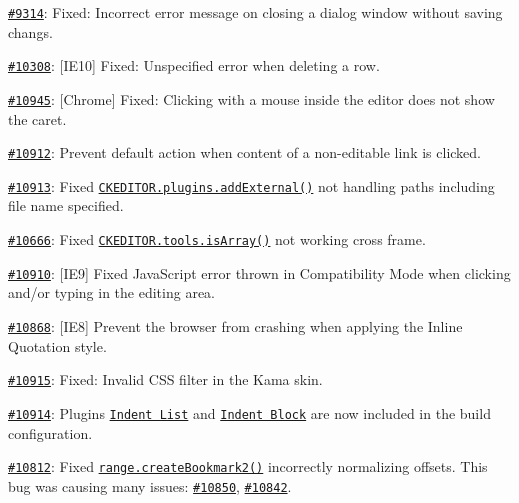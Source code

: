 {\ttfamily 
\begin{DoxyItemize}
\item \href{http://dev.ckeditor.com/ticket/9314}{\tt \#9314}\+: Fixed\+: Incorrect error message on closing a dialog window without saving changs.
\item \href{http://dev.ckeditor.com/ticket/10308}{\tt \#10308}\+: \mbox{[}I\+E10\mbox{]} Fixed\+: Unspecified error when deleting a row.
\item \href{http://dev.ckeditor.com/ticket/10945}{\tt \#10945}\+: \mbox{[}Chrome\mbox{]} Fixed\+: Clicking with a mouse inside the editor does not show the caret.
\item \href{http://dev.ckeditor.com/ticket/10912}{\tt \#10912}\+: Prevent default action when content of a non-\/editable link is clicked.
\item \href{http://dev.ckeditor.com/ticket/10913}{\tt \#10913}\+: Fixed \href{http://docs.ckeditor.com/#!/api/CKEDITOR.resourceManager-method-addExternal}{\tt {\ttfamily C\+K\+E\+D\+I\+T\+O\+R.\+plugins.\+add\+External()}} not handling paths including file name specified.
\item \href{http://dev.ckeditor.com/ticket/10666}{\tt \#10666}\+: Fixed \href{http://docs.ckeditor.com/#!/api/CKEDITOR.tools-method-isArray}{\tt {\ttfamily C\+K\+E\+D\+I\+T\+O\+R.\+tools.\+is\+Array()}} not working cross frame.
\item \href{http://dev.ckeditor.com/ticket/10910}{\tt \#10910}\+: \mbox{[}I\+E9\mbox{]} Fixed Java\+Script error thrown in Compatibility Mode when clicking and/or typing in the editing area.
\item \href{http://dev.ckeditor.com/ticket/10868}{\tt \#10868}\+: \mbox{[}I\+E8\mbox{]} Prevent the browser from crashing when applying the Inline Quotation style.
\item \href{http://dev.ckeditor.com/ticket/10915}{\tt \#10915}\+: Fixed\+: Invalid C\+SS filter in the Kama skin.
\item \href{http://dev.ckeditor.com/ticket/10914}{\tt \#10914}\+: Plugins \href{http://ckeditor.com/addon/indentlist}{\tt Indent List} and \href{http://ckeditor.com/addon/indentblock}{\tt Indent Block} are now included in the build configuration.
\item \href{http://dev.ckeditor.com/ticket/10812}{\tt \#10812}\+: Fixed \href{http://docs.ckeditor.com/#!/api/CKEDITOR.dom.range-method-createBookmark2}{\tt {\ttfamily range.\+create\+Bookmark2()}} incorrectly normalizing offsets. This bug was causing many issues\+: \href{http://dev.ckeditor.com/ticket/10850}{\tt \#10850}, \href{http://dev.ckeditor.com/ticket/10842}{\tt \#10842}.

\end{DoxyItemize}}
